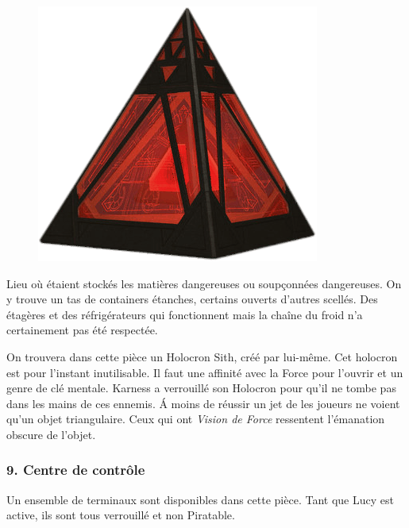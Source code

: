 \begin{figure}
    \vspace{-5\baselineskip}
    \centering\includegraphics[width=\linewidth]{_img/holocron-sith.png}
    \vspace{-2\baselineskip} 
\end{figure}
Lieu où étaient stockés les matières dangereuses ou soupçonnées dangereuses. On y trouve un tas de containers étanches, certains ouverts d’autres scellés. Des étagères et des réfrigérateurs qui fonctionnent mais la chaîne du froid n’a certainement pas été respectée.

On trouvera dans cette pièce un Holocron Sith, créé par  lui-même. Cet holocron est pour l’instant inutilisable. Il faut une affinité avec la Force pour l’ouvrir et un genre de clé mentale. Karness a verrouillé son Holocron pour qu’il ne tombe pas dans les mains de ces ennemis. \'A moins de réussir un jet de  les joueurs ne voient qu’un objet triangulaire. Ceux qui ont \textit{Vision de Force} ressentent l’émanation obscure de l’objet.

\subsubsection{9. Centre de contrôle}
Un ensemble de terminaux sont disponibles dans cette pièce. Tant que Lucy est active, ils sont tous verrouillé et non Piratable.

